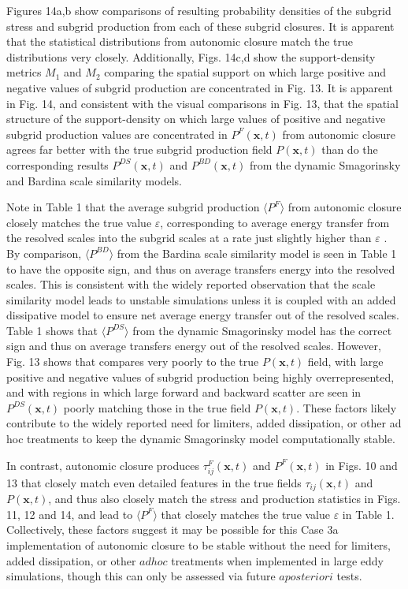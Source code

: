 Figures 14a,b show comparisons of resulting probability densities of the subgrid stress and subgrid production from each of these subgrid closures. It is apparent that the statistical distributions from autonomic closure match the true distributions very closely.  Additionally, Figs. 14c,d show the support-density metrics $M_1$  and $M_2$   comparing the spatial support on which large positive and negative values of subgrid production are concentrated in Fig. 13. It is apparent in Fig. 14, and consistent with the visual comparisons in Fig. 13, that the spatial structure of the support-density on which large values of positive and negative subgrid production values are concentrated in  $P^{F}(\mathbf{x},t)$  from autonomic closure agrees far better with the true subgrid production field $P(\mathbf{x},t)$  than do the corresponding results $P^{DS}(\mathbf{x},t)$  and $P^{BD}(\mathbf{x},t)$ from the dynamic Smagorinsky and Bardina scale similarity models.

Note in Table 1 that the average subgrid production $\langle P^F \rangle$  from autonomic closure closely matches the true value $\varepsilon$, corresponding to average energy transfer from the resolved scales into the subgrid scales at a rate just slightly higher than $\varepsilon$ . By comparison,  $\langle P^{BD} \rangle$ from the Bardina scale similarity model is seen in Table 1 to have the opposite sign, and thus on average transfers energy into the resolved scales. This is consistent with the widely reported observation that the scale similarity model leads to unstable simulations unless it is coupled with an added dissipative model to ensure net average energy transfer out of the resolved scales. Table 1 shows that $\langle P^{DS} \rangle$  from the dynamic Smagorinsky model has the correct sign and thus on average transfers energy out of the resolved scales. However, Fig. 13 shows that   compares very poorly to the true  $P(\mathbf{x},t)$ field, with large positive and negative values of subgrid production being highly overrepresented, and with regions in which large forward and backward scatter are seen in  $P^{DS}(\mathbf{x},t)$ poorly matching those in the true field $P(\mathbf{x},t)$. These factors likely contribute to the widely reported need for limiters, added dissipation, or other ad hoc treatments to keep the dynamic Smagorinsky model computationally stable. 

In contrast, autonomic closure produces $\tau_{ij}^F(\mathbf{x},t)$ and  $P^F(\mathbf{x},t)$ in Figs. 10 and 13 that closely match even detailed features in the true fields $\tau_{ij}(\mathbf{x},t)$ and  $P(\mathbf{x},t)$, and thus also closely match the stress and production statistics in Figs. 11, 12 and 14, and lead to $\langle P^F \rangle$  that closely matches the true value $\varepsilon$ in Table 1. Collectively, these factors suggest it may be possible for this Case 3a implementation of autonomic closure to be stable without the need for limiters, added dissipation, or other $ad hoc$ treatments when implemented in large eddy simulations, though this can only be assessed via future $a posteriori$ tests. 

